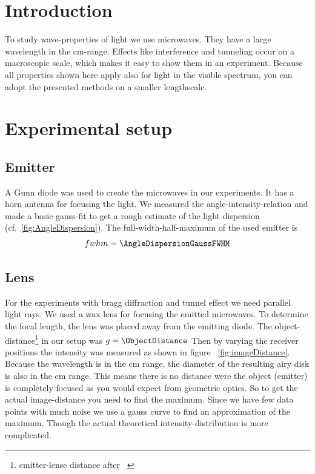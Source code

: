 \documentclass[a4paper,10pt,twocolumn]{article}
\begin{document}
    \section{Introduction}
    To study wave-properties of light we use microwaves.
    They have a large wavelength in the cm-range.
    Effects like interference and tunneling occur on a macroscopic scale, which makes it easy to show them
    in an experiment.
    Because all properties shown here apply also for light in the visible spectrum, you can 
    adopt the presented methods on a smaller lengthscale.
    \section{Experimental setup}
    \subsection{Emitter}

    
    A Gunn diode was used to create the microwaves in our experiments. 
    It has a horn antenna for focusing the light.
    We measured the angle-intensity-relation and made a basic gauss-fit to get a rough estimate of the light dispersion (cf.~\ref{fig:AngleDispersion}).
    The full-width-half-maximum of the used emitter is
    \begin{align*}
        fwhm = \AngleDispersionGaussFWHM
    \end{align*}
    
    \subsection{Lens}

    
    For the experiments with bragg diffraction and tunnel effect we need parallel light rays.
    We used a wax lens for focusing the emitted microwaves.
    To determine the focal length, the lens was placed away from the emitting diode.
    The object-distance\footnote{emitter-lense distance after ~\cite{pasco}} in our setup was $g = \ObjectDistance$
    Then by varying the receiver positions the intensity was measured as shown in figure ~\ref{fig:imageDistance}. 
    Because the wavelength is in the cm range, the diameter of the resulting airy disk is also in the cm range.
    This means there is no distance were the object (emitter) is completely focused as you would expect from geometric optics.
    So to get the actual image-distance you need to find the maximum.
    Since we have few data points with much noise we use a gauss curve to find an approximation of the maximum.
    Though the actual theoretical intensity-distribution is more complicated.
    
\end{document}
